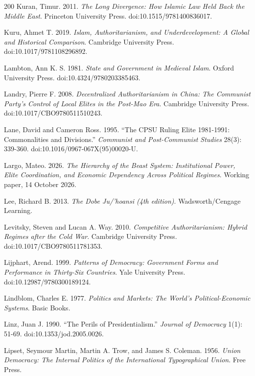 \documentclass[11pt,letterpaper]{article}
\theoremstyle{definition}
\theoremstyle{remark}
\begin{document}
\begin{thebibliography}{200}
Kuran, Timur. 2011. \emph{The Long Divergence: How Islamic Law Held Back the Middle East}. Princeton University Press. doi:10.1515/9781400836017.

Kuru, Ahmet T. 2019. \emph{Islam, Authoritarianism, and Underdevelopment: A Global and Historical Comparison}. Cambridge University Press. doi:10.1017/9781108296892.

Lambton, Ann K. S. 1981. \emph{State and Government in Medieval Islam}. Oxford University Press. doi:10.4324/9780203385463.

Landry, Pierre F. 2008. \emph{Decentralized Authoritarianism in China: The Communist Party's Control of Local Elites in the Post-Mao Era}. Cambridge University Press. doi:10.1017/CBO9780511510243.

Lane, David and Cameron Ross. 1995. ``The CPSU Ruling Elite 1981-1991: Commonalities and Divisions.'' \emph{Communist and Post-Communist Studies} 28(3): 339-360. doi:10.1016/0967-067X(95)00020-U.

Largo, Mateo. 2026. \emph{The Hierarchy of the Beast System: Institutional Power, Elite Coordination, and Economic Dependency Across Political Regimes}. Working paper, 14 October 2026.

Lee, Richard B. 2013. \emph{The Dobe Ju/'hoansi (4th edition)}. Wadsworth/Cengage Learning.

Levitsky, Steven and Lucan A. Way. 2010. \emph{Competitive Authoritarianism: Hybrid Regimes after the Cold War}. Cambridge University Press. doi:10.1017/CBO9780511781353.

Lijphart, Arend. 1999. \emph{Patterns of Democracy: Government Forms and Performance in Thirty-Six Countries}. Yale University Press. doi:10.12987/9780300189124.

Lindblom, Charles E. 1977. \emph{Politics and Markets: The World's Political-Economic Systems}. Basic Books.

Linz, Juan J. 1990. ``The Perils of Presidentialism.'' \emph{Journal of Democracy} 1(1): 51-69. doi:10.1353/jod.2005.0026.

Lipset, Seymour Martin, Martin A. Trow, and James S. Coleman. 1956. \emph{Union Democracy: The Internal Politics of the International Typographical Union}. Free Press.


\end{thebibliography}
\end{document}
